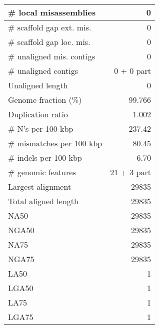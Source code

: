 \documentclass[12pt,a4paper]{article}
\begin{document}
\begin{table}[ht]
\begin{center}
\begin{tabular}{|l*{1}{|r}|}
\# local misassemblies & 0 \\ \hline
\# scaffold gap ext. mis. & 0 \\ \hline
\# scaffold gap loc. mis. & 0 \\ \hline
\# unaligned mis. contigs & 0 \\ \hline
\# unaligned contigs & 0 + 0 part \\ \hline
Unaligned length & 0 \\ \hline
Genome fraction (\%) & 99.766 \\ \hline
Duplication ratio & 1.002 \\ \hline
\# N's per 100 kbp & 237.42 \\ \hline
\# mismatches per 100 kbp & 80.45 \\ \hline
\# indels per 100 kbp & 6.70 \\ \hline
\# genomic features & 21 + 3 part \\ \hline
Largest alignment & 29835 \\ \hline
Total aligned length & 29835 \\ \hline
NA50 & 29835 \\ \hline
NGA50 & 29835 \\ \hline
NA75 & 29835 \\ \hline
NGA75 & 29835 \\ \hline
LA50 & 1 \\ \hline
LGA50 & 1 \\ \hline
LA75 & 1 \\ \hline
LGA75 & 1 \\ \hline
\end{tabular}
\end{center}
\end{table}
\end{document}

